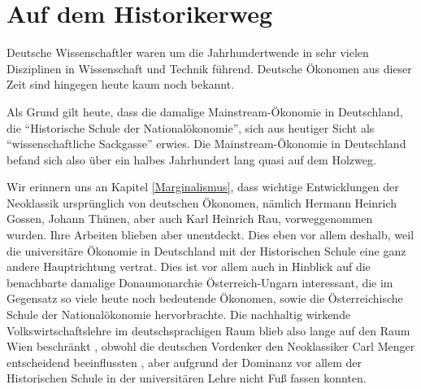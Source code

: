 %
%
%

\chapter{Auf dem Historikerweg}
\label{Historisch}

Deutsche Wissenschaftler waren um die Jahrhundertwende in sehr vielen Disziplinen in Wissenschaft und Technik führend. Deutsche Ökonomen aus dieser Zeit sind hingegen heute kaum noch bekannt.

Als Grund gilt heute, dass die damalige Mainstream-Ökonomie in Deutschland, die "`Historische Schule der Nationalökonomie"', sich aus heutiger Sicht als "`wissenschaftliche Sackgasse"' \parencite[S. 229]{Rosner2012} erwies. Die Mainstream-Ökonomie in Deutschland befand sich also über ein halbes Jahrhundert lang quasi auf dem Holzweg.

Wir erinnern uns an Kapitel \ref{Marginalismus}, dass wichtige Entwicklungen der Neoklassik ursprünglich von deutschen Ökonomen, nämlich Hermann Heinrich Gossen, Johann Thünen, aber auch Karl Heinrich Rau, vorweggenommen wurden. Ihre Arbeiten blieben aber unentdeckt. Dies eben vor allem deshalb, weil die universitäre Ökonomie in Deutschland mit der Historischen Schule eine ganz andere Hauptrichtung vertrat. Dies ist vor allem auch in Hinblick auf die benachbarte damalige Donaumonarchie Österreich-Ungarn interessant, die im Gegensatz so viele heute noch bedeutende Ökonomen, sowie die Österreichische Schule der Nationalökonomie hervorbrachte. Die nachhaltig wirkende Volkswirtschaftslehre im deutschsprachigen Raum blieb also lange auf den Raum Wien beschränkt \parencite[S. 339]{Rosner2012}, obwohl die deutschen Vordenker den Neoklassiker Carl Menger entscheidend beeinflussten \parencite{Streissler1990}, aber aufgrund der Dominanz vor allem der Historischen Schule in der universitären Lehre nicht Fuß fassen konnten.

